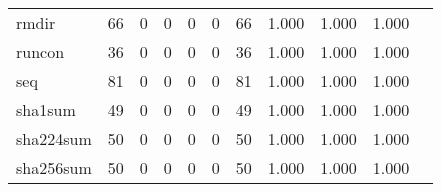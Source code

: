 \begin{longtable}{lp{1.2cm}p{1.2cm}p{1.2cm}p{1.2cm}p{1.2cm}p{1.2cm}p{1.2cm}p{1.2cm}p{1.2cm}p{1.2cm}}
rmdir     &                                    66 &                                                  0 &                                                  0 &                                                  0 &                                                  0 &                                                 66 &                                              1.000 &                                              1.000 &                                              1.000 \\
runcon    &                                    36 &                                                  0 &                                                  0 &                                                  0 &                                                  0 &                                                 36 &                                              1.000 &                                              1.000 &                                              1.000 \\
seq       &                                    81 &                                                  0 &                                                  0 &                                                  0 &                                                  0 &                                                 81 &                                              1.000 &                                              1.000 &                                              1.000 \\
sha1sum   &                                    49 &                                                  0 &                                                  0 &                                                  0 &                                                  0 &                                                 49 &                                              1.000 &                                              1.000 &                                              1.000 \\
sha224sum &                                    50 &                                                  0 &                                                  0 &                                                  0 &                                                  0 &                                                 50 &                                              1.000 &                                              1.000 &                                              1.000 \\
sha256sum &                                    50 &                                                  0 &                                                  0 &                                                  0 &                                                  0 &                                                 50 &                                              1.000 &                                              1.000 &                                              1.000 \\

\end{longtable}
